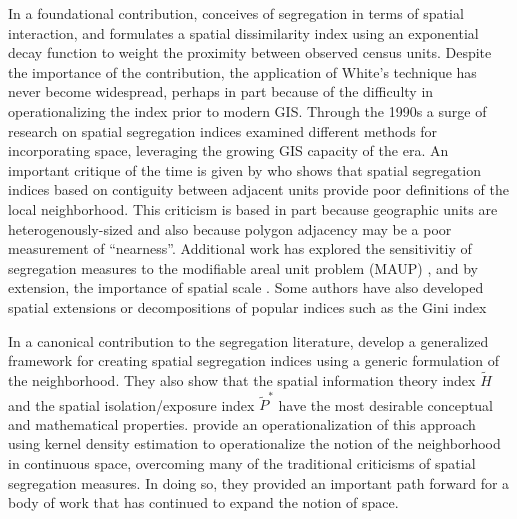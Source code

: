 \documentclass[
  10pt,
]{article}
\begin{document}
In a foundational contribution, \citet{white1983MeasurementSpatial}
conceives of segregation in terms of spatial interaction, and formulates
a spatial dissimilarity index using an exponential decay function to
weight the proximity between observed census units. Despite the
importance of the contribution, the application of White's technique has
never become widespread, perhaps in part because of the difficulty in
operationalizing the index prior to modern GIS. Through the 1990s a
surge of research on spatial segregation indices examined different
methods for incorporating space, leveraging the growing GIS capacity of
the era. An important critique of the time is given by
\citet{wong1993SpatialIndices} who shows that spatial segregation
indices based on contiguity between adjacent units provide poor
definitions of the local neighborhood. This criticism is based in part
because geographic units are heterogenously-sized and also because
polygon adjacency may be a poor measurement of ``nearness''. Additional
work has explored the sensitivitiy of segregation measures to the
modifiable areal unit problem (MAUP)
\citep{openshaw1984EcologicalFallacies}, and by extension, the
importance of spatial scale
\citep{wong1997SpatialDependency, wong2004ComparingTraditional}. Some
authors have also developed spatial extensions or decompositions of
popular indices such as the Gini index
\citep{dawkins2004MeasuringSpatial, rey2011ImpactSpatial}

In a canonical contribution to the segregation literature,
\citet{reardon2004MeasuresSpatial} develop a generalized framework for
creating spatial segregation indices using a generic formulation of the
neighborhood. They also show that the spatial information theory index
\(\tilde{H}\) and the spatial isolation/exposure index
\(\tilde{P}^\ast\) have the most desirable conceptual and mathematical
properties. \citet{osullivan2007SurfaceBasedApproach} provide an
operationalization of this approach using kernel density estimation to
operationalize the notion of the neighborhood in continuous space,
overcoming many of the traditional criticisms of spatial segregation
measures. In doing so, they provided an important path forward for a
body of work that has continued to expand the notion of space.
\end{document}
